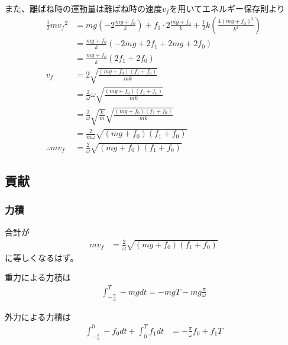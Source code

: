 \documentclass[a4paper,11pt]{jsarticle}
\begin{document}
また、離ばね時の運動量は離ばね時の速度$v_f$を用いてエネルギー保存則より
\begin{align}
  \frac{1}{2}m{v_f}^2
   & = mg\left(-2\frac{mg+f_0}{k}\right)
  + f_1\cdot 2\frac{mg+f_0}{k} + \frac{1}{2}k\left( \frac{4(mg+f_0)^2}{k^2} \right)
  \\
   & = \frac{mg+f_0}{k}\left( -2mg + 2f_1 + 2mg + 2f_0 \right)
  \\
   & = \frac{mg+f_0}{k}\left( 2f_1 + 2f_0 \right)
  \\
  v_f
   & = 2\sqrt{\frac{(mg + f_0) (f_1 + f_0)}{mk}}
  \\
   & = \frac{2}{\omega}\omega \sqrt{\frac{(mg + f_0) (f_1 + f_0)}{mk}}
  \\
   & = \frac{2}{\omega} \sqrt{\frac{k}{m}} \sqrt{\frac{(mg + f_0) (f_1 + f_0)}{mk}}
  \\
   & = \frac{2}{m\omega}\sqrt{(mg + f_0)(f_1 + f_0)}
  \\ \therefore
  mv_f
   & = \frac{2}{\omega} \sqrt{(mg + f_0)(f_1 + f_0)}
\end{align}

\subsection{貢献}

\subsubsection{力積}
合計が
\begin{align}
  mv_f
   & = \frac{2}{\omega} \sqrt{(mg + f_0)(f_1 + f_0)}
\end{align}
に等しくなるはず。

重力による力積は
\begin{align}
  \int_{-\frac{\pi}{\omega}}^{T} -mgdt = -mgT - mg\frac{\pi}{\omega}
\end{align}

外力による力積は
\begin{align}
  \int_{-\frac{\pi}{\omega}}^{0} -f_0 dt
  + \int_0^T f_1 dt
   & = -\frac{\pi}{\omega}f_0 + f_1 T
\end{align}
\end{document}
